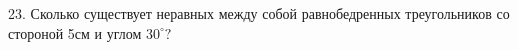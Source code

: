 23. Сколько существует неравных между собой равнобедренных треугольников со стороной 5см и углом $30^\circ ?$\\
